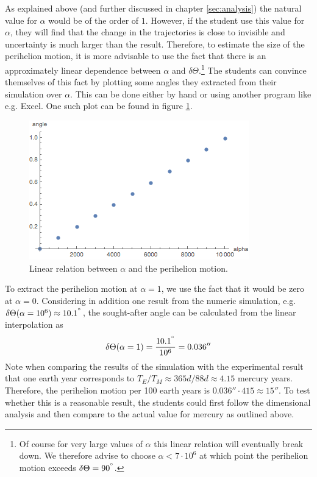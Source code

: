 \documentclass[12pt]{iopart}
\begin{document}
As explained above (and further discussed in chapter \ref{sec:analysis}) the natural value for $\alpha$ would be of the order of $1$.
However, if the student use this value for $\alpha$, they will find that the change in the trajectories is close to invisible and uncertainty is much larger than the result.
Therefore, to estimate the size of the perihelion motion, it is more advisable to use the fact that there is an approximately linear dependence between $\alpha$ and $\delta \Theta$.\footnote{Of course for very large values of $\alpha$ this linear relation will eventually break down. We therefore advise to choose $\alpha<7\cdot 10^6$ at which point the perihelion motion exceeds $\delta \Theta=90^{\degree}$.}
The students can convince themselves of this fact by plotting some angles they extracted from their simulation over $\alpha$.
This can be done either by hand or using another program like e.g. Excel.
One such plot can be found in figure \ref{fig:AlphaAngle}.

\begin{figure}[htb]
	\centering
	\includegraphics[width=.5\textwidth]{figs/AlphaAngle.png}
	\caption{\label{fig:AlphaAngle} Linear relation between $\alpha$ and the perihelion motion.}
\end{figure}

To extract the perihelion motion at $\alpha = 1$, we use the fact that it would be zero at
 $\alpha =0$. 
Considering in addition one result from the numeric simulation, e.g. $\delta\Theta(\alpha = 10^6) \approx 10.1^{\degree}$, the sought-after angle can be calculated from the linear interpolation as
\begin{equation}
	\delta\Theta (\alpha=1) = \frac{10.1^{\degree}}{10^6} = 0.036''
\end{equation}
Note when comparing the results of the simulation with the experimental result that one earth year corresponds to $T_E/T_M \approx 365d/88d\approx 4.15$ mercury years.
Therefore, the perihelion motion per 100 earth years is $0.036''\cdot 415\approx 15''$.
To test whether this is a reasonable result, the students could first follow the dimensional analysis and then compare to the actual value for mercury as outlined above.
\end{document}
